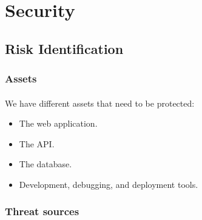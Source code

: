 \section{Security}
\subsection{Risk Identification}
\subsubsection{Assets}
\paragraph{} We have different assets that need to be protected:
\begin{itemize}
	\item The web application.
	\item The API.
	\item The database.
	\item Development, debugging, and deployment tools.
\end{itemize}

\subsubsection{Threat sources}
